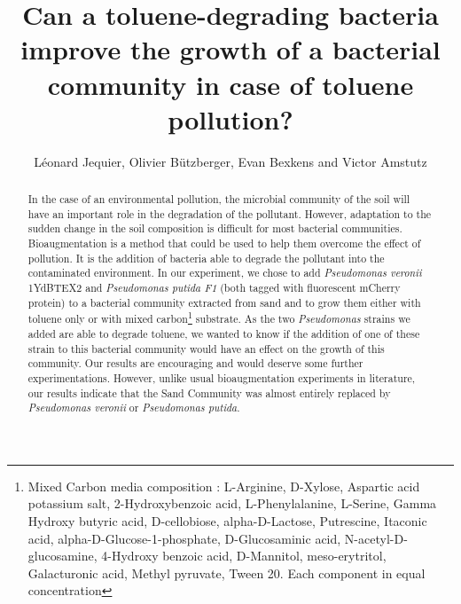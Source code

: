 \documentclass[a4paper, 10pt, conference]{ieeeconf}   %
\title{\LARGE \bf
Can a toluene-degrading bacteria improve the growth of a bacterial community in case of toluene pollution?
}
\author{Léonard Jequier, Olivier Bützberger, Evan Bexkens and Victor Amstutz%
}
\begin{document}
\vspace{-2cm}
\maketitle
\thispagestyle{plain}
\pagestyle{plain}

\begin{abstract}

	

In the case of an environmental pollution, the microbial community of the soil will have an important role in the degradation of the pollutant. However, adaptation to the sudden change in the soil composition is difficult for most bacterial communities. Bioaugmentation is a method that could be used to help them overcome the effect of pollution. It is the addition of bacteria able to degrade the pollutant into the contaminated environment. In our experiment, we chose to add \textit{Pseudomonas veronii} 1YdBTEX2 and \textit{Pseudomonas putida F1} (both tagged with fluorescent mCherry protein) to a bacterial community extracted from sand and to grow them either with toluene only or with mixed carbon\footnote{Mixed Carbon media composition : L-Arginine, D-Xylose, Aspartic acid potassium salt, 2-Hydroxybenzoic acid, L-Phenylalanine, L-Serine, Gamma Hydroxy butyric acid, D-cellobiose, alpha-D-Lactose, Putrescine, Itaconic acid, alpha-D-Glucose-1-phosphate, D-Glucosaminic acid, N-acetyl-D-glucosamine, 4-Hydroxy benzoic acid, D-Mannitol, meso-erytritol, Galacturonic acid, Methyl pyruvate, Tween 20. Each component in equal concentration} substrate. As the two \textit{Pseudomonas} strains we added are able to degrade toluene, we wanted to know if the addition of one of these strain to this bacterial community would have an effect on the growth of this community.
Our results are encouraging and would deserve some further experimentations. However, unlike usual bioaugmentation experiments in literature, our results indicate that the Sand Community was almost entirely replaced by \textit{Pseudomonas veronii} or \textit{Pseudomonas putida}.


\end{abstract}
\end{document}
